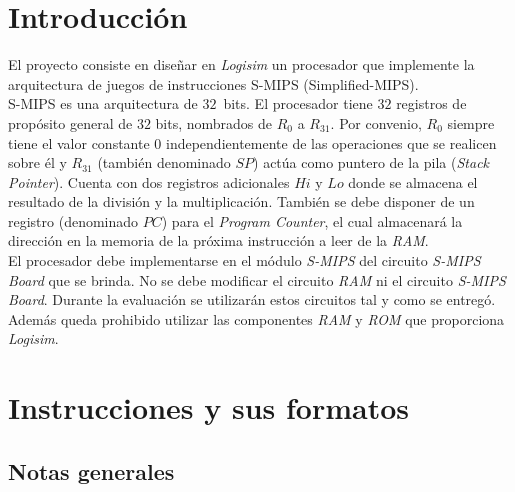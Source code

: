\documentclass[12pt]{amsart}
\begin{document}
	
	\newpage

	\tableofcontents
	
	\newpage
	
	\section{Introducción}
	
	El proyecto consiste en diseñar en \textit{Logisim} un procesador que implemente la arquitectura de juegos de instrucciones S-MIPS (Simplified-MIPS).\\
	
	S-MIPS es una arquitectura de $32$~bits. El procesador tiene $32$ registros de propósito general de $32$ bits, nombrados de $R_0$ a $R_{31}$. Por convenio, $R_0$ siempre tiene el valor constante $0$ independientemente de las operaciones que se realicen sobre él y $R_{31}$ (también denominado $SP$) actúa como puntero de la pila (\textit{Stack Pointer}). Cuenta con dos registros adicionales $Hi$ y $Lo$ donde se almacena el resultado de la división y la multiplicación. También se debe disponer de un registro (denominado $PC$) para el \textit{Program Counter}, el cual almacenará la dirección en la memoria de la próxima instrucción a leer de la \textit{RAM}.\\
	
	El procesador debe implementarse en el módulo \textit{S-MIPS} del circuito \textit{S-MIPS Board} que se brinda. No se debe modificar el circuito \textit{RAM} ni el circuito \textit{S-MIPS Board}. Durante la evaluación se utilizarán estos circuitos tal y como se entregó. Además queda prohibido utilizar las componentes \textit{RAM} y \textit{ROM} que proporciona \textit{Logisim}.
	
	\section{Instrucciones y sus formatos}
	
	\subsection{Notas generales}
	
\end{document}
